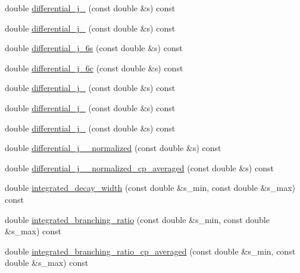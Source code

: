 \begin{DoxyCompactItemize}
\item 
double \hyperlink{classeos_1_1BToKstarDilepton_3_01LargeRecoil_01_4_ad32e45ca26888cb44aa57be1073fdf85}{differential\_\-j\_} (const double \&s) const 
\item 
double \hyperlink{classeos_1_1BToKstarDilepton_3_01LargeRecoil_01_4_a6cf2f7cc28e08361993972b3e51dd3e4}{differential\_\-j\_} (const double \&s) const 
\item 
double \hyperlink{classeos_1_1BToKstarDilepton_3_01LargeRecoil_01_4_a0373ddd6d8366a8fabf90c9ae3f3c525}{differential\_\-j\_\-6s} (const double \&s) const 
\item 
double \hyperlink{classeos_1_1BToKstarDilepton_3_01LargeRecoil_01_4_ad789a2b55467f5e020494afad9f51f3a}{differential\_\-j\_\-6c} (const double \&s) const 
\item 
double \hyperlink{classeos_1_1BToKstarDilepton_3_01LargeRecoil_01_4_a3ce2c68d373c5abb0f1992f1474f86ee}{differential\_\-j\_} (const double \&s) const 
\item 
double \hyperlink{classeos_1_1BToKstarDilepton_3_01LargeRecoil_01_4_a0f2479e014f0b9b98412728c459d3cf0}{differential\_\-j\_} (const double \&s) const 
\item 
double \hyperlink{classeos_1_1BToKstarDilepton_3_01LargeRecoil_01_4_ad51b237eaae2b1f6ef47bc3b4194682c}{differential\_\-j\_} (const double \&s) const 
\item 
double \hyperlink{classeos_1_1BToKstarDilepton_3_01LargeRecoil_01_4_a78b433cd38a04ca1ec8991aa7b26ac79}{differential\_\-j\_\_\-normalized} (const double \&s) const 
\item 
double \hyperlink{classeos_1_1BToKstarDilepton_3_01LargeRecoil_01_4_ada2f49a4978c95250e3c282e079e0952}{differential\_\-j\_\_\-normalized\_\-cp\_\-averaged} (const double \&s) const 
\item 
double \hyperlink{classeos_1_1BToKstarDilepton_3_01LargeRecoil_01_4_adbfb9ebdedeba02edf74bf82ca7c1b6e}{integrated\_\-decay\_\-width} (const double \&s\_\-min, const double \&s\_\-max) const 
\item 
double \hyperlink{classeos_1_1BToKstarDilepton_3_01LargeRecoil_01_4_a7a272263b3e040fabd6a78bb54557dbf}{integrated\_\-branching\_\-ratio} (const double \&s\_\-min, const double \&s\_\-max) const 
\item 
double \hyperlink{classeos_1_1BToKstarDilepton_3_01LargeRecoil_01_4_a50645c68f1852c1746ad770de4de9de4}{integrated\_\-branching\_\-ratio\_\-cp\_\-averaged} (const double \&s\_\-min, const double \&s\_\-max) const 
\item 

\end{DoxyCompactItemize}
